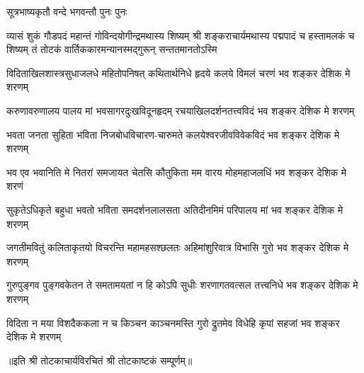 

%
{सूत्रभाष्यकृतौ वन्दे भगवन्तौ पुनः पुनः}%

%
{व्यासं शुकं गौडपदं महान्तं गोविन्दयोगीन्द्रमथास्य शिष्यम्}%
{श्री शङ्कराचार्यमथास्य पद्मपादं च हस्तामलकं च शिष्यम्}%
{तं तोटकं वार्तिककारमन्यानस्मद्गुरून् सन्ततमानतोऽस्मि}%

\twolineshloka
{विदिताखिलशास्त्रसुधाजलधे महितोपनिषत् कथितार्थनिधे}%
{हृदये कलये विमलं चरणं भव शङ्कर देशिक मे शरणम्}%


\twolineshloka
{करुणावरुणालय पालय मां भवसागरदुःखविदूनहृदम्}%
{रचयाखिलदर्शनतत्त्वविदं भव शङ्कर देशिक मे शरणम्}%


\twolineshloka
{भवता जनता सुहिता भविता निजबोधविचारण-चारुमते}%
{कलयेश्वरजीवविवेकविदं भव शङ्कर देशिक मे शरणम्}%


\twolineshloka
{भव एव भवानिति मे नितरां समजायत चेतसि कौतुकिता}%
{मम वारय मोहमहाजलधिं भव शङ्कर देशिक मे शरणं }%


\twolineshloka
{सुकृतेऽधिकृते बहुधा भवतो भविता समदर्शनलालसता}%
{अतिदीनमिमं परिपालय मां भव शङ्कर देशिक मे शरणम्}%


\twolineshloka
{जगतीमवितुं कलिताकृतयो विचरन्ति महामहसश्छलतः}%
{अहिमांशुरिवात्र विभासि गुरो भव शङ्कर देशिक मे शरणम्}%


\twolineshloka
{गुरुपुङ्गव पुङ्गवकेतन ते समतामयतां न हि कोऽपि सुधीः}%
{शरणागतवत्सल तत्त्वनिधे भव शङ्कर देशिक मे शरणम्}%


\twolineshloka
{विदिता न मया विशदैककला न च किञ्चन काञ्चनमस्ति गुरो}%
{द्रुतमेव विधेहि कृपां सहजां भव शङ्कर देशिक मे शरणम्}%

॥इति श्री तोटकाचार्यविरचितं श्री तोटकाष्टकं सम्पूर्णम्॥